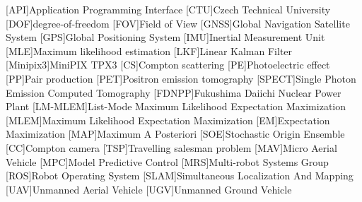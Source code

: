 
\begin{acronym}
  [API]{Application Programming Interface}
  [CTU]{Czech Technical University}
  [DOF]{degree-of-freedom}
  [FOV]{Field of View}
  [GNSS]{Global Navigation Satellite System}
  [GPS]{Global Positioning System}
  [IMU]{Inertial Measurement Unit}
  [MLE]{Maximum likelihood estimation}  
  [LKF]{Linear Kalman Filter}
  [Minipix3]{MiniPIX TPX3}
  [CS]{Compton scattering}
  [PE]{Photoelectric effect}
  [PP]{Pair production}
  [PET]{Positron emission tomography}
  [SPECT]{Single Photon Emission Computed Tomography}
  [FDNPP]{Fukushima Daiichi Nuclear Power Plant}
  [LM-MLEM]{List-Mode Maximum Likelihood Expectation Maximization}
  [MLEM]{Maximum Likelihood Expectation Maximization}
  [EM]{Expectation Maximization}
  [MAP]{Maximum A Posteriori}
  [SOE]{Stochastic Origin Ensemble}
  [CC]{Compton camera}
  [TSP]{Travelling salesman problem}
  [MAV]{Micro Aerial Vehicle}
  [MPC]{Model Predictive Control}
  [MRS]{Multi-robot Systems Group}
  [ROS]{Robot Operating System}
  [SLAM]{Simultaneous Localization And Mapping}
  [UAV]{Unmanned Aerial Vehicle}
  [UGV]{Unmanned Ground Vehicle}
\end{acronym}
